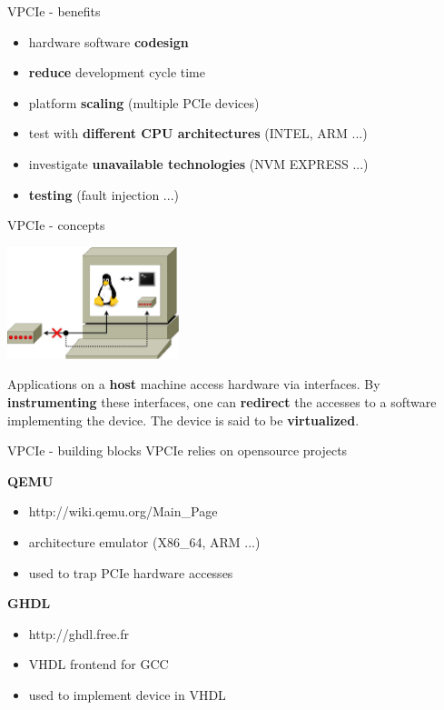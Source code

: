 \documentclass{beamer}
\begin{document}
\begin{frame}{VPCIe - benefits}
  \begin{itemize}
  \item hardware software \textbf{codesign}
  \item \textbf{reduce} development cycle time
  \item platform \textbf{scaling} (multiple PCIe devices)
  \item test with \textbf{different CPU architectures} (INTEL, ARM ...)
  \item investigate \textbf{unavailable technologies} (NVM EXPRESS ...)
  \item \textbf{testing} (fault injection ...)
  \end{itemize}
\end{frame}

\begin{frame}{VPCIe - concepts}
  \begin{center}
    \includegraphics[width=50mm]{pic/dv_redirect/main.jpeg}
  \end{center}
  \begin{small}
    Applications on a \textbf{host} machine access hardware via interfaces. By
    \textbf{instrumenting} these interfaces, one can \textbf{redirect} the
    accesses to a software implementing the device. The device is said to be
    \textbf{virtualized}.
  \end{small}
\end{frame}

\begin{frame}{VPCIe - building blocks}
  VPCIe relies on opensource projects
  \newline

  \textbf{QEMU}
  \begin{itemize}
  \item http://wiki.qemu.org/Main\_Page
  \item architecture emulator (X86\_64, ARM ...)
  \item used to trap PCIe hardware accesses
  \end{itemize}

  \textbf{GHDL}
  \begin{itemize}
  \item http://ghdl.free.fr
  \item VHDL frontend for GCC
  \item used to implement device in VHDL
  \end{itemize}

\end{frame}
\end{document}
